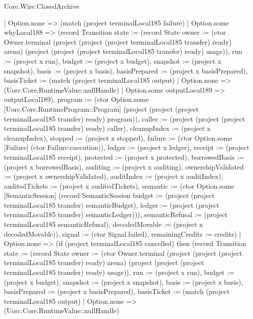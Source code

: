 \begin{lexlean}{Uorc.Wire.ClosedArchive}
\begin{semanticmodule}
{        | Option.none => (match (project terminalLocal185 failure)
          | Option.some whyLocal188 => (record Transition {state := (record State {owner := (ctor Owner.terminal (project (project (project terminalLocal185 transfer) ready) arena) (project (project (project terminalLocal185 transfer) ready) usage)), run := (project x run), budget := (project x budget), snapshot := (project x snapshot), basis := (project x basis), basisPrepared := (project x basisPrepared), basisTicket := (match (project terminalLocal185 output)
            | Option.none => (Uorc.Core.RuntimeValue::nullHandle)
            | Option.some outputLocal189 => outputLocal189), program := (ctor Option.some [Uorc.Core.RuntimeProgram::Program] (project (project (project terminalLocal185 transfer) ready) program)), caller := (project (project (project terminalLocal185 transfer) ready) caller), cleanupIndex := (project x cleanupIndex), stopped := (project x stopped), failure := (ctor Option.some [Failure] (ctor Failure.execution)), ledger := (project x ledger), receipt := (project terminalLocal185 receipt), protected := (project x protected), borrowedBasis := (project x borrowedBasis), auditing := (project x auditing), ownershipValidated := (project x ownershipValidated), auditIndex := (project x auditIndex), auditedTickets := (project x auditedTickets), semantic := (ctor Option.some [SemanticSession] (record SemanticSession {budget := (project (project terminalLocal185 transfer) semanticBudget), ledger := (project (project terminalLocal185 transfer) semanticLedger)})), semanticRefusal := (project terminalLocal185 semanticRefusal), decodedMovable := (project x decodedMovable)}), signal := (ctor Signal.failed), remainingCredits := credits})
          | Option.none => (if (project terminalLocal185 cancelled) then (record Transition {state := (record State {owner := (ctor Owner.terminal (project (project (project terminalLocal185 transfer) ready) arena) (project (project (project terminalLocal185 transfer) ready) usage)), run := (project x run), budget := (project x budget), snapshot := (project x snapshot), basis := (project x basis), basisPrepared := (project x basisPrepared), basisTicket := (match (project terminalLocal185 output)
            | Option.none => (Uorc.Core.RuntimeValue::nullHandle)
}}}
\end{semanticmodule}
\end{lexlean}

